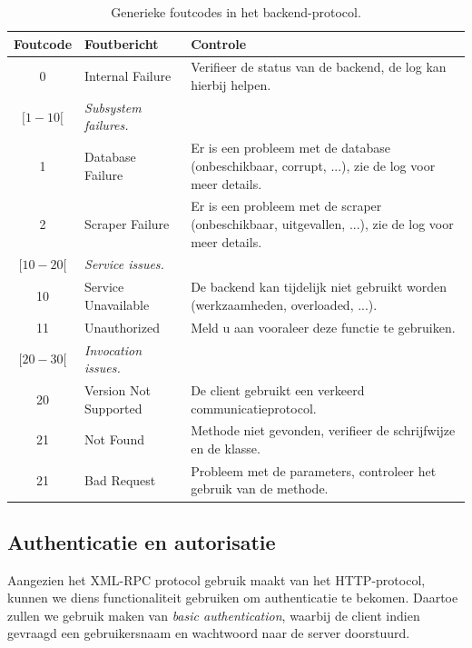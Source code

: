 \begin{table}
\begin{tabular}{| c p{5cm} p{7cm} |}
	\hline
	Foutcode & Foutbericht & Controle \\
	\hline
	
	0 & Internal Failure & Verifieer de status van de backend, de log kan hierbij helpen. \\
	\hline
	
	$[1-10[$ & \emph{Subsystem failures.} & \\
	1 & Database Failure & Er is een probleem met de database (onbeschikbaar, corrupt, ...), zie de log voor meer details. \\
	2 & Scraper Failure & Er is een probleem met de scraper (onbeschikbaar, uitgevallen, ...), zie de log voor meer details. \\
	\hline
	
	$[10-20[$ & \emph{Service issues.} & \\
	10 & Service Unavailable & De backend kan tijdelijk niet gebruikt worden (werkzaamheden, overloaded, ...). \\
	11 & Unauthorized & Meld u aan vooraleer deze functie te gebruiken. \\
	\hline
	
	$[20-30[$ & \emph{Invocation issues.} & \\
	20 & Version Not Supported & De client gebruikt een verkeerd communicatieprotocol. \\
	21 & Not Found & Methode niet gevonden, verifieer de schrijfwijze en de klasse. \\
	21 & Bad Request & Probleem met de parameters, controleer het gebruik van de methode. \\
	\hline
\end{tabular}
\caption{Generieke foutcodes in het backend-protocol.}
\end{table}

\subsection{Authenticatie en autorisatie}

Aangezien het XML-RPC protocol gebruik maakt van het HTTP-protocol, kunnen we diens functionaliteit gebruiken om authenticatie te bekomen. Daartoe zullen we gebruik maken van \emph{basic authentication}, waarbij de client indien gevraagd een gebruikersnaam en wachtwoord naar de server doorstuurd.

